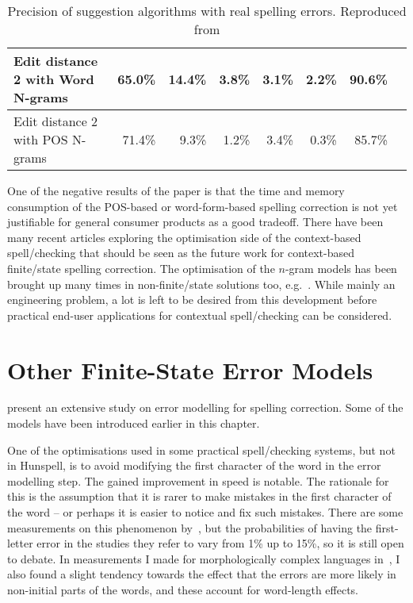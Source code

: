 \documentclass[officiallayout,final]{unihelcompling}
\begin{document}
\begin{table}
\begin{tabular}{lrrrrrrr}
        \hline
        Edit distance 2 with Word N-grams
& 65.0\% & 14.4\% & 3.8\% & 3.1\% & 2.2\% & 90.6\% \\
        \hline
        Edit distance 2 with POS N-grams
& 71.4\% & 9.3\% & 1.2\% & 3.4\% & 0.3\% & 85.7\% \\
        \hline
    \end{tabular}
  \caption{Precision of suggestion algorithms with real spelling errors.
      Reproduced from 
  \label{table:repro-2012-cicling}}
\end{table}

One of the negative results of the paper is that the time and memory
consumption of the POS-based or word-form-based spelling correction is not yet
justifiable for general consumer products as a good tradeoff. There have been
many recent articles exploring the optimisation side of the context-based
spell\-/checking that should be seen as the future work for context-based
finite\-/state spelling correction. The optimisation of the \(n\)-gram models
has been brought up many times in non-finite\-/state solutions too,
e.g.~\citet{church2007compressing}. While mainly an engineering problem, a lot
is left to be desired from this development before practical end-user
applications for contextual spell\-/checking can be considered.

\section{Other Finite-State Error Models}
\label{sec:other-errors}

\citet{deorowicz2005correcting} present an extensive study on error
modelling for spelling correction. Some of the models have been
introduced earlier in this chapter.

One of the optimisations used in some practical spell\-/checking systems,
but not in Hunspell, is to avoid modifying the first character of the word in
the error modelling step. The gained improvement in speed is notable. The
rationale for this is the assumption that it is rarer to make mistakes in the
first character of the word -- or perhaps it is easier to notice and fix such
mistakes. There are some measurements on this phenomenon
by~\citet{bhagat2007spelling}, but the probabilities of having the first-letter
error in the studies they refer to vary from 1\% up to 15\%, so it is still
open to debate. In measurements I made for morphologically complex languages
in~, I also found a slight tendency towards
the effect that the errors are more likely in non-initial parts of the words,
and these account for word-length effects.
\end{document}
